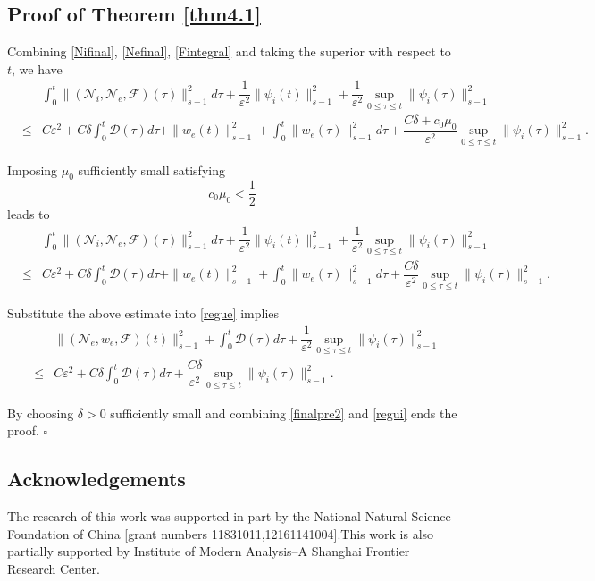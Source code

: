 \documentclass[reqno,twoside,12pt,a4paper]{amsart}
\newcommand{\eps}{\mathbb{\varepsilon}}
\newcommand{\calf}{\mathcal{F}}
\newcommand{\Ni}{\mathcal{N}_i}
\newcommand{\Ne}{\mathcal{N}_e}
\numberwithin{equation}{section}
\begin{document}
\subsection*{Proof of Theorem \ref{thm4.1}} Combining \eqref{Nifinal}, \eqref{Nefinal}, \eqref{Fintegral} and taking the superior with respect to $t$, we have
\begin{eqnarray*}
&&\int_0^t\|(\Ni,\Ne,\calf)(\tau)\|_{s-1}^2d\tau +\dfrac{1}{\eps^2}\|\psi_i(t)\|_{s-1}^2+\dfrac{1}{\eps^2}\sup_{0\leq \tau \leq t}\|\psi_i(\tau)\|_{s-1}^2\\
&\leq& C\eps^2+C\delta\int_0^t\mathcal{D}(\tau)d\tau+\|w_e(t)\|_{s-1}^2+\int_0^t\|w_e(\tau)\|_{s-1}^2d\tau +\dfrac{C \delta+c_0\mu_0}{\eps^2} \sup_{0\leq \tau \leq t}\|\psi_i(\tau)\|_{s-1}^2.
\end{eqnarray*}

Imposing $\mu_0$ sufficiently small satisfying
\begin{equation}\label{mu0}
c_0 \mu_0<\dfrac{1}{2}
\end{equation}
leads to
\begin{eqnarray*}
&&\int_0^t\|(\Ni,\Ne,\calf)(\tau)\|_{s-1}^2d\tau +\dfrac{1}{\eps^2}\|\psi_i(t)\|_{s-1}^2+\dfrac{1}{\eps^2}\sup_{0\leq \tau \leq t}\|\psi_i(\tau)\|_{s-1}^2\\
&\leq& C\eps^2+C\delta\int_0^t\mathcal{D}(\tau)d\tau+\|w_e(t)\|_{s-1}^2+\int_0^t\|w_e(\tau)\|_{s-1}^2d\tau +\dfrac{C \delta}{\eps^2} \sup_{0\leq \tau \leq t}\|\psi_i(\tau)\|_{s-1}^2.
\end{eqnarray*}

Substitute the above estimate into \eqref{regue} implies
\begin{eqnarray*}
 &&\|(\Ne,w_e,\mathcal{F})(t)\|_{s-1}^2 + \int_0^t\mathcal{D}(\tau)d\tau+\dfrac{1}{\eps^2}\sup_{0\leq \tau \leq t}\|\psi_i(\tau)\|_{s-1}^2 \\
 &\leq&  C\eps^2+C\delta\int_0^t\mathcal{D}(\tau)d\tau+\dfrac{C \delta}{\eps^2} \sup_{0\leq \tau \leq t}\|\psi_i(\tau)\|_{s-1}^2.
\end{eqnarray*}

By choosing $\delta>0$ sufficiently small and combining \eqref{finalpre2} and \eqref{regui} ends the proof. \hfill $\square$ 


\subsection*{Acknowledgements} The research of this work was supported in part by the National Natural Science Foundation of China [grant numbers 11831011,12161141004].This work is also partially
supported by Institute of Modern Analysis–A Shanghai Frontier Research Center.

	
	
	
	
\end{document}
